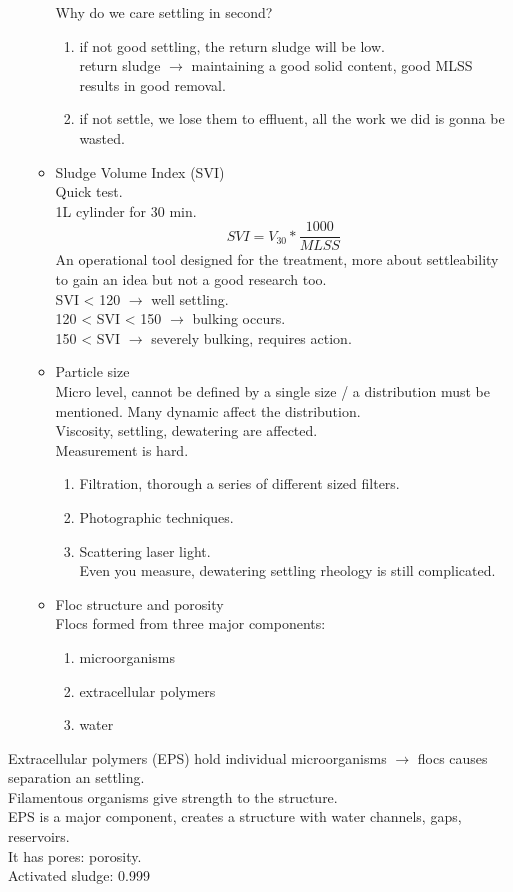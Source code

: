\documentclass[12pt]{article}
\begin{document}
\begin{enumerate}
\begin{itemize}
        Why do we care settling in second?
        \begin{enumerate}
            \item if not good settling, the return sludge will be low.\\
            return sludge $\rightarrow$ maintaining a good solid content, good MLSS results in good removal.
            \item if not settle, we lose them to effluent, all the work we did is gonna be wasted.
        \end{enumerate}
        \item Sludge Volume Index (SVI)\\
        Quick test.\\
        1L cylinder for 30 min.
        \[SVI = V_{30} * \frac{1000}{MLSS}\]
        An operational tool designed for the  treatment, more about settleability to gain an idea but not a good research too.\\
        SVI < 120 $\rightarrow$ well settling.\\
        120 < SVI < 150 $\rightarrow$ bulking occurs.\\
        150 < SVI $\rightarrow$ severely bulking, requires action.
        \item Particle size\\
        Micro level, cannot be defined by a single size / a distribution must be mentioned.
        Many dynamic affect the distribution.\\
        Viscosity, settling, dewatering are affected.\\
        Measurement is hard.
        \begin{enumerate}
            \item Filtration, thorough a series of different sized filters.
            \item Photographic techniques.
            \item Scattering laser light.\\
            Even you measure, dewatering settling rheology is still complicated.
        \end{enumerate}
        \item Floc structure and porosity\\
        Flocs formed from three major components:
        \begin{enumerate}
            \item microorganisms
            \item extracellular polymers
            \item water
        \end{enumerate}
    \end{itemize}
\end{enumerate}
Extracellular polymers (EPS) hold individual microorganisms $\rightarrow$ flocs causes separation an settling.\\
Filamentous organisms give strength to the structure.\\
EPS is a major component, creates a structure with water channels, gaps, reservoirs.\\
It has pores: porosity.\\
Activated sludge: 0.999
\end{document}
